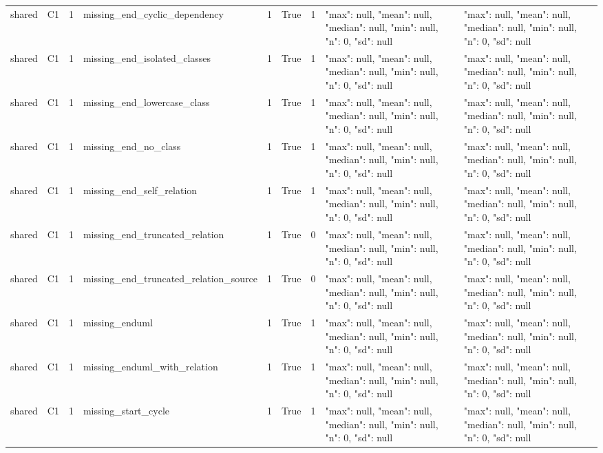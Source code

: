 \begin{tabular}{lllllllll}
shared & C1 & 1 & missing\_end\_cyclic\_dependency & 1 & True & 1 & {"max": null, "mean": null, "median": null, "min": null, "n": 0, "sd": null} & {"max": null, "mean": null, "median": null, "min": null, "n": 0, "sd": null} \\
shared & C1 & 1 & missing\_end\_isolated\_classes & 1 & True & 1 & {"max": null, "mean": null, "median": null, "min": null, "n": 0, "sd": null} & {"max": null, "mean": null, "median": null, "min": null, "n": 0, "sd": null} \\
shared & C1 & 1 & missing\_end\_lowercase\_class & 1 & True & 1 & {"max": null, "mean": null, "median": null, "min": null, "n": 0, "sd": null} & {"max": null, "mean": null, "median": null, "min": null, "n": 0, "sd": null} \\
shared & C1 & 1 & missing\_end\_no\_class & 1 & True & 1 & {"max": null, "mean": null, "median": null, "min": null, "n": 0, "sd": null} & {"max": null, "mean": null, "median": null, "min": null, "n": 0, "sd": null} \\
shared & C1 & 1 & missing\_end\_self\_relation & 1 & True & 1 & {"max": null, "mean": null, "median": null, "min": null, "n": 0, "sd": null} & {"max": null, "mean": null, "median": null, "min": null, "n": 0, "sd": null} \\
shared & C1 & 1 & missing\_end\_truncated\_relation & 1 & True & 0 & {"max": null, "mean": null, "median": null, "min": null, "n": 0, "sd": null} & {"max": null, "mean": null, "median": null, "min": null, "n": 0, "sd": null} \\
shared & C1 & 1 & missing\_end\_truncated\_relation\_source & 1 & True & 0 & {"max": null, "mean": null, "median": null, "min": null, "n": 0, "sd": null} & {"max": null, "mean": null, "median": null, "min": null, "n": 0, "sd": null} \\
shared & C1 & 1 & missing\_enduml & 1 & True & 1 & {"max": null, "mean": null, "median": null, "min": null, "n": 0, "sd": null} & {"max": null, "mean": null, "median": null, "min": null, "n": 0, "sd": null} \\
shared & C1 & 1 & missing\_enduml\_with\_relation & 1 & True & 1 & {"max": null, "mean": null, "median": null, "min": null, "n": 0, "sd": null} & {"max": null, "mean": null, "median": null, "min": null, "n": 0, "sd": null} \\
shared & C1 & 1 & missing\_start\_cycle & 1 & True & 1 & {"max": null, "mean": null, "median": null, "min": null, "n": 0, "sd": null} & {"max": null, "mean": null, "median": null, "min": null, "n": 0, "sd": null} \\

\end{tabular}
